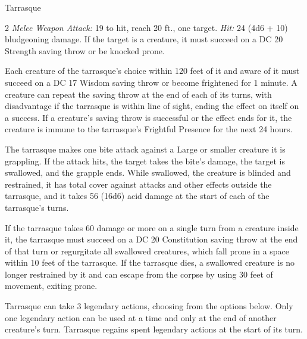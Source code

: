 \documentclass[10pt,a4paper,twoside,bg=print,twocolumn,openany,nodeprecatedcode]{dndbook}
\begin{document}
\begin{DndMonster}[float*=b,width=\textwidth + 8pt]{Tarrasque}
\begin{multicols}{2}
\textsl{Melee Weapon Attack:} 19 to hit, reach 20 ft., one target. \textsl{Hit:} 24 (4d6 + 10) bludgeoning damage. If the target is a creature, it must succeed on a DC 20 Strength saving throw or be knocked prone.

Each creature of the tarrasque's choice within 120 feet of it and aware of it must succeed on a DC 17 Wisdom saving throw or become frightened for 1 minute. A creature can repeat the saving throw at the end of each of its turns, with disadvantage if the tarrasque is within line of sight, ending the effect on itself on a success. If a creature's saving throw is successful or the effect ends for it, the creature is immune to the tarrasque's Frightful Presence for the next 24 hours.

The tarrasque makes one bite attack against a Large or smaller creature it is grappling. If the attack hits, the target takes the bite's damage, the target is swallowed, and the grapple ends. While swallowed, the creature is blinded and restrained, it has total cover against attacks and other effects outside the tarrasque, and it takes 56 (16d6) acid damage at the start of each of the tarrasque's turns.

If the tarrasque takes 60 damage or more on a single turn from a creature inside it, the tarrasque must succeed on a DC 20 Constitution saving throw at the end of that turn or regurgitate all swallowed creatures, which fall prone in a space within 10 feet of the tarrasque. If the tarrasque dies, a swallowed creature is no longer restrained by it and can escape from the corpse by using 30 feet of movement, exiting prone.

Tarrasque can take 3 legendary actions, choosing from the options below. Only one legendary action can be used at a time and only at the end of another creature's turn. Tarrasque regains spent legendary actions at the start of its turn.

\begin{DndMonsterLegendaryActions}
\end{DndMonsterLegendaryActions}
\end{multicols}
\end{DndMonster}
\end{document}

